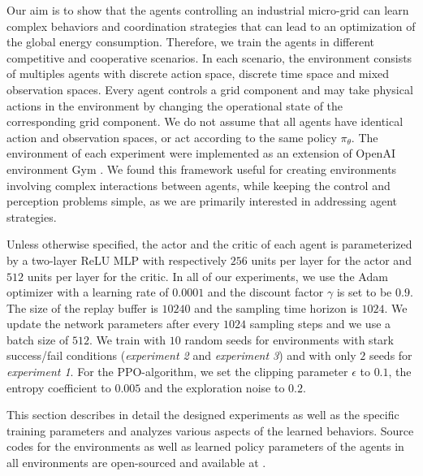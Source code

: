 Our aim is to show that the agents controlling an industrial micro-grid can learn complex behaviors and coordination strategies that can lead to an optimization of the global energy consumption. Therefore, we train the agents in different competitive and cooperative scenarios. In each scenario, the environment consists of multiples agents with discrete action space, discrete time space and mixed observation spaces. Every agent controls a grid component and may take physical actions in the environment by changing the operational state of the corresponding grid component. We do not assume that all agents have identical action and observation spaces, or act according to the same policy $\pi_{\theta}$. The environment of each experiment were implemented as an extension of OpenAI environment Gym \cite{Brockman01540}. We found this framework useful for creating environments involving complex interactions between agents, while keeping the control and perception problems simple, as we are primarily interested in addressing agent strategies. 

Unless otherwise specified, the actor and the critic of each agent is parameterized by a two-layer ReLU MLP with respectively $256$ units per layer for the actor and $512$ units per layer for the critic. In all of our experiments, we use the Adam optimizer with a learning rate of $0.0001$ and the discount factor $\gamma$ is set to be $0.9$. The size of the replay buffer is $10240$ and the sampling time horizon is $1024$. We update the network parameters after every $1024$ sampling steps and we use a batch size of $512$. We train with $10$ random seeds for environments with stark success/fail conditions (\textit{experiment 2} and \textit{experiment 3}) and with only $2$ seeds for \textit{experiment 1}. For the PPO-algorithm, we set the clipping parameter $\epsilon$ to $0.1$, the entropy coefficient to $0.005$ and the exploration noise to $0.2$.

This section describes in detail the designed experiments as well as the specific training parameters and analyzes various aspects of the learned behaviors. Source codes for the environments as well as learned policy parameters of the agents in all environments are open-sourced and available at \cite{Bakakeu2019}.

